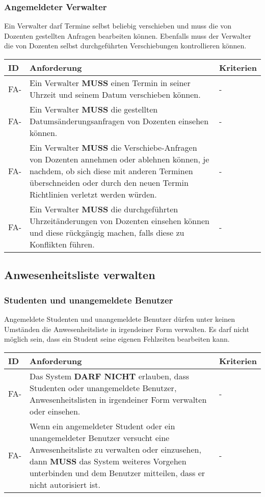 \subsubsection{Angemeldeter Verwalter}

Ein Verwalter darf Termine selbst beliebig verschieben und muss die von Dozenten gestellten Anfragen bearbeiten können. Ebenfalls muss der Verwalter die von Dozenten selbst durchgeführten Verschiebungen kontrollieren können.

\vspace{12pt}

\begin{tabular} {|p{}|p{11cm}|p{}|}
	\hline
	ID & Anforderung & Kriterien \\
	\hline
	FA-
	& Ein Verwalter \textbf{MUSS} einen Termin in seiner Uhrzeit und seinem Datum verschieben können.
	& - \\
	\hline
	FA-
	& Ein Verwalter \textbf{MUSS} die gestellten Datumsänderungsanfragen von Dozenten einsehen können.
	& - \\
	\hline
	FA-
	& Ein Verwalter \textbf{MUSS} die Verschiebe-Anfragen von Dozenten annehmen oder ablehnen können, je nachdem, ob sich diese mit anderen Terminen überschneiden oder durch den neuen Termin Richtlinien verletzt werden würden.
	& - \\
	\hline
	FA-
	& Ein Verwalter \textbf{MUSS} die durchgeführten Uhrzeitänderungen von Dozenten einsehen können und diese rückgängig machen, falls diese zu Konflikten führen.
	& - \\
	\hline
\end{tabular}

\newpage

\subsection{Anwesenheitsliste verwalten}

\subsubsection{Studenten und unangemeldete Benutzer}
Angemeldete Studenten und unangemeldete Benutzer dürfen unter keinen Umständen die Anwesenheitsliste in irgendeiner Form verwalten. Es darf nicht möglich sein, dass ein Student seine eigenen Fehlzeiten bearbeiten kann.

\vspace{12pt}

\begin{tabular} {|p{}|p{11cm}|p{}|}
	\hline
	ID & Anforderung & Kriterien \\
	\hline
	FA-
	& Das System \textbf{DARF NICHT} erlauben, dass Studenten oder unangemeldete Benutzer, Anwesenheitslisten in irgendeiner Form verwalten oder einsehen. 
	& - \\
	\hline
	FA-
	& Wenn ein angemeldeter Student oder ein unangemeldeter Benutzer versucht eine Anwesenheitsliste zu verwalten oder einzusehen, dann \textbf{MUSS} das System weiteres Vorgehen unterbinden und dem Benutzer mitteilen, dass er nicht autorisiert ist.
	& - \\ 
	\hline
\end{tabular}

